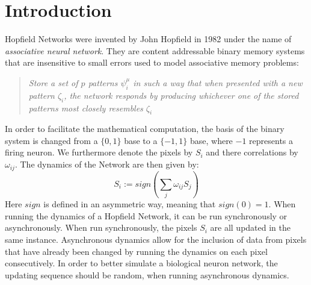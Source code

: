 		\section{Introduction}

Hopfield Networks were invented by John Hopfield in 1982 under the name of \textit{associative neural network}. They are content addressable binary memory systems that are insensitive to small errors used to model associative memory problems: 
\begin{quote}
\textit{Store a set of $p$ patterns $\psi_i^\mu$ in such a way that when presented with a new pattern $\zeta_i$, the network responds by producing whichever one of the stored patterns most closely resembles $\zeta_i$} \citep{Polk:2002fk}
\end{quote}

In order to facilitate the mathematical computation, the basis of the binary system is changed from a $\{0,1\}$ base to a $\{-1,1\}$ base, where $-1$ represents a firing neuron. We furthermore denote the pixels by $S_i$ and there correlations by $\omega_{ij}$. The dynamics of the Network are then given by:
\begin{equation}
S_i := sign \left( \sum_j \omega_{ij} S_j \right)
\label{eq: sequential dynamics}
\end{equation}
Here $sign$ is defined in an asymmetric way, meaning that $sign(0)=1$. 
When running the dynamics of a Hopfield Network, it can be run synchronously or asynchronously. When run synchronously, the pixels $S_i$ are all updated in the same instance. Asynchronous dynamics allow for the inclusion of data from pixels that have already been changed by running the dynamics on each pixel consecutively. In order to better simulate a biological neuron network, the updating sequence should be random, when running asynchronous dynamics. 

